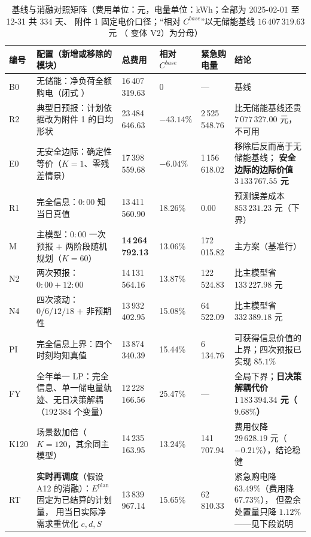 \begin{table}[htbp]
  \centering
  \caption{基线与消融对照矩阵（费用单位：元，电量单位：kWh；全部为 2025-02-01 至 12-31 共 334 天、
           附件 1 固定电价口径；“相对 \(C^{base}\)”以无储能基线 \(16\,407\,319.63\) 元
           （ 变体 V2）为分母）}
  \label{tab:ablation}
  \scriptsize
  \setlength{\tabcolsep}{3pt}
  \begin{tabularx}{\linewidth}{C{0.72cm} L{3.15cm} C{2.05cm} C{1.55cm} C{1.65cm} Y}
    \toprule
    编号 & 配置（新增或移除的模块） & 总费用 & 相对 \(C^{base}\) & 紧急购电量 & 结论 \\
    \midrule
    B0 & 无储能：净负荷全额购电（闭式 ）
      & 16\,407\,319.63 & 0 & --- & 基线 \\
    R2 & 典型日预报：计划依据改为附件 1 的日均形状
      & 23\,484\,646.63 & \(-43.14\%\) & 2\,525\,548.76 & 比无储能基线还贵 \(7\,077\,327.00\) 元，不可用 \\
    E0 & 无安全边际：确定性等价（\(K=1\)、零残差情景）
      & 17\,398\,559.68 & \(-6.04\%\) & 1\,156\,618.02 & 移除后反而高于无储能基线；
        \textbf{安全边际的边际价值 \(3\,133\,767.55\) 元} \\
    R1 & 完全信息：\(0{:}00\) 知当日真值
      & 13\,411\,560.90 & 18.26\% & 0.00 & 预测误差成本 \(853\,231.23\) 元（下界） \\
    M & 主模型：\(0{:}00\) 一次预报 \(+\) 两阶段随机规划（\(K=60\)）
      & \textbf{14\,264\,792.13} & 13.06\% & 172\,015.82 & 主方案（基准行） \\
    N2 & 两次预报：\(0{:}00+12{:}00\)
      & 14\,131\,564.16 & 13.87\% & 122\,524.83 & 比主模型省 \(133\,227.98\) 元 \\
    N4 & 四次滚动：\(0/6/12/18\) \(+\) 非预期性
      & 13\,932\,402.95 & 15.08\% & 64\,522.09 & 比主模型省 \(332\,389.18\) 元 \\
    PI & 完全信息上界：四个时刻均知真值
      & 13\,874\,340.39 & 15.44\% & 6\,134.76 & 可获得信息价值的上界；四次预报已实现 \(85.1\%\) \\
    FY & 全年单一 LP：完全信息、单一储电量轨迹、无日决策解耦（192\,384 个变量）
      & 12\,228\,166.56 & 25.47\% & --- & 全局下界；\textbf{日决策解耦代价
        \(1\,183\,394.34\) 元（\(9.68\%\)）} \\
    K120 & 场景数加倍（\(K=120\)，其余同主模型）
      & 14\,235\,163.95 & 13.24\% & 141\,707.94 & 费用仅降 \(29\,628.19\) 元（\(-0.21\%\)），结论稳健 \\
    RT & \textbf{实时再调度}（假设 A12 的消融）：\(E^{\text{plan}}\) 固定为已结算的计划量，
         用当日实际净需求重优化 \(c,d,S\)
      & 13\,839\,967.14 & 15.65\% & 62\,810.33 & 紧急购电降 \(63.49\%\)（费用降 \(67.73\%\)），
        但盈余处置量只降 \(1.12\%\)——见下段说明 \\
    \bottomrule
  \end{tabularx}
\end{table}

